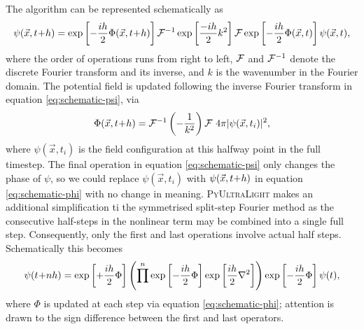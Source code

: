 \documentclass[a4paper,11pt]{article}
\newcommand{\PyUltraLight}{\textsc{PyUltraLight}\xspace}
\begin{document}
The algorithm can be represented schematically as
\begin{equation}\label{eq:schematic-psi}
    \psi(\vec{x},t\hspace*{-.2em}+\hspace*{-.2em}h)=\operatorname{exp}\left[-\frac{ih}{2}\Phi(\vec{x},t\hspace*{-.2em}+\hspace*{-.2em}h)\right]\CMcal{F}^{-1} \operatorname{exp}\left[\frac{-ih}{2}k^2\right]\CMcal{F}\operatorname{exp}\left[-\frac{ih}{2}\Phi(\vec{x},t)\right]\psi(\vec{x},t),
\end{equation}
where the order of operations runs from right to left, $\CMcal{F}$ and $\CMcal{F}^{-1}$ denote the discrete Fourier transform and its inverse, and $k$ is the wavenumber in the Fourier domain. The potential field is updated following the inverse Fourier transform in equation \ref{eq:schematic-psi}, via
%
\begin{equation}\label{eq:schematic-phi}
    \Phi(\vec{x},t\hspace*{-.2em}+\hspace*{-.2em}h)=\CMcal{F}^{-1}\left(-\frac{1}{k^2}\right)\CMcal{F}\ 4\pi\vert\psi(\vec{x},t_{i})\vert^2,
\end{equation}
%
where $\psi(\vec{x},t_{i})$ is the field configuration at this halfway point in the full timestep. The final operation in equation \ref{eq:schematic-psi}  only changes the phase of  $\psi$, so we could replace $\psi(\vec{x},t_{i})$ with $\psi(\vec{x},t\hspace*{-.2em}+\hspace*{-.2em}h)$ in equation \ref{eq:schematic-phi} with no change in meaning. \PyUltraLight makes an additional simplification ti the symmetrised split-step Fourier method as the consecutive half-steps in the nonlinear term may be combined into a single full step. Consequently, only the first and last operations involve actual half steps. Schematically this becomes 
%
\begin{equation}
    \psi(t\hspace*{-.2em}+\hspace*{-.2em}nh)=\operatorname{exp}\left[+\frac{ih}{2}\Phi\right]\left(\prod^n\operatorname{exp}\left[-\frac{ih}{2}\Phi\right]\operatorname{exp}\left[\frac{ih}{2}\nabla^2\right]\right)\operatorname{exp}\left[-\frac{ih}{2}\Phi\right]\psi(t),
\end{equation}
%
where  $\Phi$  is updated at each step via equation \ref{eq:schematic-phi}; attention is drawn to the sign difference between the first and last operators.
\end{document}
